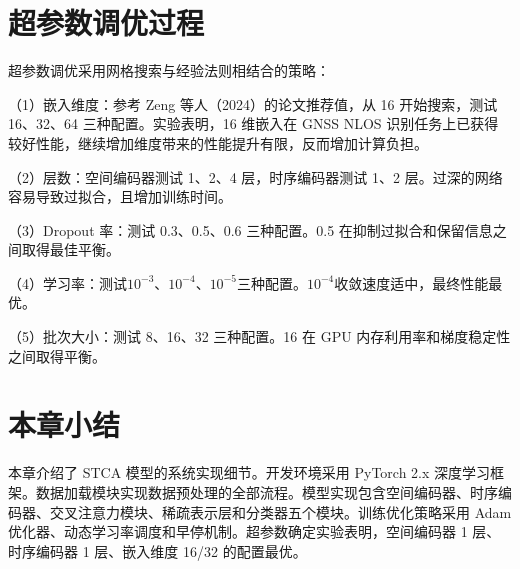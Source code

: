 \section{超参数调优过程}

超参数调优采用网格搜索与经验法则相结合的策略：

（1）嵌入维度：参考 Zeng 等人（2024）的论文推荐值，从 16 开始搜索，测试 16、32、64 三种配置。实验表明，16 维嵌入在 GNSS NLOS 识别任务上已获得较好性能，继续增加维度带来的性能提升有限，反而增加计算负担。

（2）层数：空间编码器测试 1、2、4 层，时序编码器测试 1、2 层。过深的网络容易导致过拟合，且增加训练时间。

（3）Dropout 率：测试 0.3、0.5、0.6 三种配置。0.5 在抑制过拟合和保留信息之间取得最佳平衡。

（4）学习率：测试$10^{-3}$、$10^{-4}$、$10^{-5}$三种配置。$10^{-4}$收敛速度适中，最终性能最优。

（5）批次大小：测试 8、16、32 三种配置。16 在 GPU 内存利用率和梯度稳定性之间取得平衡。

\section{本章小结}

本章介绍了 STCA 模型的系统实现细节。开发环境采用 PyTorch 2.x 深度学习框架。数据加载模块实现数据预处理的全部流程。模型实现包含空间编码器、时序编码器、交叉注意力模块、稀疏表示层和分类器五个模块。训练优化策略采用 Adam 优化器、动态学习率调度和早停机制。超参数确定实验表明，空间编码器 1 层、时序编码器 1 层、嵌入维度 16/32 的配置最优。
